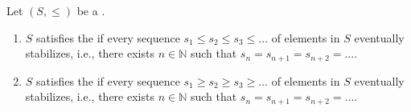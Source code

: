 \begin{definition} \label{definition:ascending_descending_chain_condition_on_a_partially_ordered_set}
Let $(S, \leq)$ be a . 
\begin{enumerate}
    \item $S$ satisfies the   if every sequence $s_1 \leq s_2 \leq s_3 \leq \dots$ of elements in $S$ eventually stabilizes, i.e., there exists $n \in \mathbb{N}$ such that $s_n = s_{n+1} = s_{n+2} = \dots$.
    \item $S$ satisfies the   if every sequence $s_1 \geq s_2 \geq s_3 \geq \dots$ of elements in $S$ eventually stabilizes, i.e., there exists $n \in \mathbb{N}$ such that $s_n = s_{n+1} = s_{n+2} = \dots$.
\end{enumerate}
\end{definition}